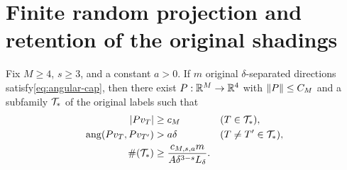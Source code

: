 \section{Finite random projection and retention of the original shadings}\label{sec:projection}

\begin{lemma}\label{lem:projection}
Fix $M\ge4$, $s\ge3$, and a constant $a>0$.
If $m$ original $\delta$-separated directions satisfy\eqref{eq:angular-cap}, then there exist
$P:\mathbb R^M\to\mathbb R^4$ with $\left\lVert P\right\rVert\le C_M$ and a subfamily $\mathcal T_*$ of the original labels such that
\begin{align}
 |Pv_T|&\ge c_M &&(T\in\mathcal T_*),\label{eq:nonshort}\\
 \operatorname{ang}(Pv_T,Pv_{T'})&>a\delta &&(T\ne T'\in\mathcal T_*),\label{eq:projected-separated}\\
 \#\!\left(\mathcal T_*\right)&\ge
 \frac{c_{M,s,a}m}{A\delta^{3-s}L_\delta}.\label{eq:projection-count}
\end{align}
\end{lemma}

